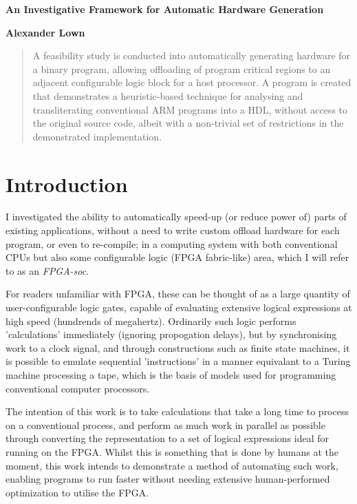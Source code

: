 \documentclass[a4paper]{article}
\begin{document}
\centerline{\Large \bf An Investigative Framework for Automatic Hardware Generation}
\medskip
\centerline{\bf Alexander Lown}
\bigskip

\begin{abstract}
  A feasibility study is conducted into automatically generating hardware for a binary program, allowing offloading of program critical regions to an adjacent configurable logic block for a host processor.
  A program is created that demonstrates a heuristic-based technique for analysing and transliterating conventional ARM programs into a HDL, without access to the original source code, albeit with a non-trivial set of restrictions in the demonstrated implementation.
\end{abstract}

\section{Introduction}
I investigated the ability to automatically speed-up (or reduce power of) parts of existing applications, without a need to write custom offload hardware for each program, or even to re-compile; in a computing system with both conventional CPUs but also some configurable logic (FPGA fabric-like) area, which I will refer to as an \emph{FPGA-soc}.

For readers unfamiliar with FPGA, these can be thought of as a large quantity of user-configurable logic gates, capable of evaluating extensive logical expressions at high speed (hundrends of megahertz). Ordinarily such logic performs 'calculations' immediately (ignoring propogation delays), but by synchronising work to a clock signal, and through constructions such as finite state machines, it is possible to emulate sequential 'instructions' in a manner equivalant to a Turing machine processing a tape, which is the basis of models used for programming conventional computer processors.

The intention of this work is to take calculations that take a long time to process on a conventional process, and perform as much work in parallel as possible through converting the representation to a set of logical expressions ideal for running on the FPGA. Whilst this is something that is done by humans at the moment, this work intends to demonstrate a method of automating such work, enabling programs to run faster without needing extensive human-performed optimization to utilise the FPGA.
\end{document}
